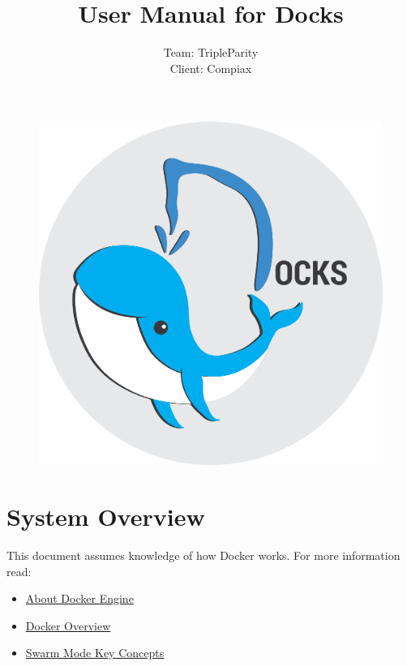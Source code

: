 \documentclass[]{article}
\title{User Manual for Docks}
\author{Team: TripleParity\\
Client: Compiax}
\date{}
\providecommand{\tightlist}{%
	\setlength{\itemsep}{0pt}\setlength{\parskip}{0pt}}
\begin{document}
\maketitle

\begin{figure}[H]
	\includegraphics[scale=0.7]{docks_round_512.png}
	\centering
\end{figure}

\tableofcontents

\pagebreak

\section{System Overview}

This document assumes knowledge of how Docker works. For more information
read:
\begin{itemize}
	\tightlist
	\item \href{https://docs.docker.com/engine/}{About Docker Engine}
	\item \href{https://docs.docker.com/engine/docker-overview/}{Docker Overview}
	\item \href{https://docs.docker.com/engine/swarm/key-concepts/}{Swarm Mode Key Concepts}
\end{itemize}
\end{document}
